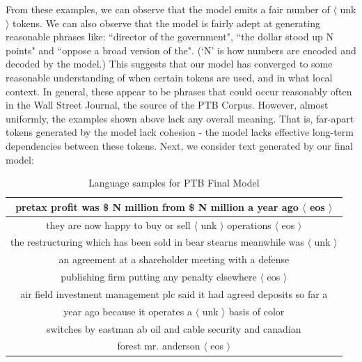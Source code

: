 \documentclass[a4paper]{article}
\begin{document}
From these examples, we can observe that the model emits a fair number of $\langle$ unk $\rangle$ tokens. We can also observe that the model is fairly adept at generating reasonable phrases like: ``director of the government", ``the dollar stood up N points" and ``oppose a broad version of the". (`N' is how numbers are encoded and decoded by the model.) This suggests that our model has converged to some reasonable understanding of when certain tokens are used, and in what local context. In general, these appear to be phrases that could occur reasonably often in the Wall Street Journal, the source of the PTB Corpus. However, almost uniformly, the examples shown above lack any overall meaning. That is, far-apart tokens generated by the model lack cohesion - the model lacks effective long-term dependencies between these tokens.
\newline
\newline
Next, we consider text generated by our final model:

\begin{table}[h]
\centering
\begin{tabular}{|c|} \hline
pretax profit was \$ N million from \$ N million a year ago $\langle$ eos $\rangle$ \\ \hline
they are now happy to buy or sell $\langle$ unk $\rangle$ operations $\langle$ eos $\rangle$ \\ \hline
the restructuring which has been sold in bear stearns meanwhile was $\langle$ unk $\rangle$ \\
an agreement at a shareholder meeting with a defense \\
publishing firm putting any penalty elsewhere $\langle$ eos $\rangle$ \\ \hline
air field investment management plc said it had agreed deposits so far a \\
year ago because it operates a $\langle$ unk $\rangle$ basis of color \\
switches by eastman ab oil and cable security and canadian \\
forest mr. anderson $\langle$ eos $\rangle$ \\ \hline
\end{tabular}
\caption{Language samples for PTB Final Model}
\label{table:1}
\end{table}
\end{document}
